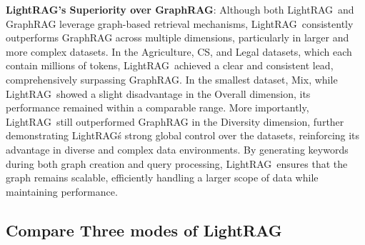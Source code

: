 \documentclass{article} %
\def\model{LightRAG}
\begin{document}
\textbf{\model's Superiority over GraphRAG}: 
Although both \model\ and GraphRAG leverage graph-based retrieval mechanisms, \model\ consistently outperforms GraphRAG across multiple dimensions, particularly in larger and more complex datasets. In the Agriculture, CS, and Legal datasets, which each contain millions of tokens, \model\ achieved a clear and consistent lead, comprehensively surpassing GraphRAG. In the smallest dataset, Mix, while \model\ showed a slight disadvantage in the Overall dimension, its performance remained within a comparable range. More importantly, \model\ still outperformed GraphRAG in the Diversity dimension, further demonstrating \model\'s strong global control over the datasets, reinforcing its advantage in diverse and complex data environments. By generating keywords during both graph creation and query processing, \model\ ensures that the graph remains scalable, efficiently handling a larger scope of data while maintaining performance.

\subsection{Compare Three modes of LightRAG}
\end{document}

